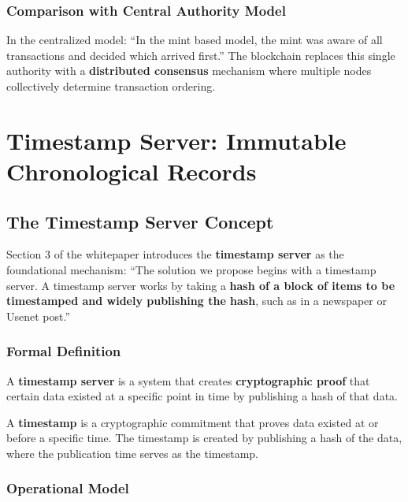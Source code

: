 \subsubsection{Comparison with Central Authority Model}

In the centralized model: ``In the mint based model, the mint was aware of all transactions and decided which arrived first.'' The blockchain replaces this single authority with a \textbf{distributed consensus} mechanism where multiple nodes collectively determine transaction ordering.


\section{Timestamp Server: Immutable Chronological Records}
\label{sec:timestamp-server}

\subsection{The Timestamp Server Concept}
\label{subsec:ts-concept}

Section 3 of the whitepaper introduces the \textbf{timestamp server} as the foundational mechanism: ``The solution we propose begins with a timestamp server. A timestamp server works by taking a \textbf{hash of a block of items to be timestamped and widely publishing the hash}, such as in a newspaper or Usenet post.''

\subsubsection{Formal Definition}

A \textbf{timestamp server} is a system that creates \textbf{cryptographic proof} that certain data existed at a specific point in time by publishing a hash of that data.

A \textbf{timestamp} is a cryptographic commitment that proves data existed at or before a specific time. The timestamp is created by publishing a hash of the data, where the publication time serves as the timestamp.

\subsubsection{Operational Model}

